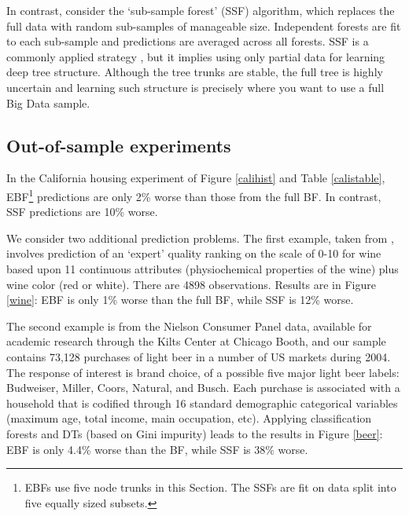 \documentclass{article}
\begin{document}
In contrast, consider the `sub-sample forest' (SSF) algorithm, which replaces the full data with random sub-samples of manageable size.  Independent forests are  fit to each sub-sample and predictions are averaged across all forests.
SSF is a commonly applied strategy \citep[e.g., see mention, but not recommendation, of it in][]{panda_planet:_2009}, but it implies using only partial data for learning deep tree structure.  Although the tree trunks are stable, the full tree is highly uncertain and learning such structure is precisely where you want to use a full Big Data sample.


\subsection{Out-of-sample experiments}\label{oos-experiment}

 
In the California housing  experiment of Figure \ref{calihist}
and Table \ref{calistable}, EBF\footnote{EBFs use five node trunks  in this Section.  The SSFs are fit on data split into five equally sized subsets.} predictions are only 2\% worse than those from the full BF.  In contrast, SSF predictions are 10\% worse.

We consider two additional prediction problems.  The first example, 
taken from \cite{CorCer09}, involves prediction of an `expert' quality ranking on
the scale of 0-10 for wine based upon 11 continuous attributes (physiochemical properties of the wine) plus
wine color (red or white).  There are 4898 observations.  Results are in Figure \ref{wine}:  EBF is only 1\% worse than the full BF, while SSF is 12\% worse.

The second example is from the Nielson Consumer Panel data, available for
academic research through the Kilts Center at Chicago Booth,
 and our sample contains 73,128 purchases
of light beer in a number of US markets  during 2004. The response of interest
is brand choice, of a possible five major light beer labels: Budweiser,
Miller, Coors, Natural, and Busch. Each purchase is associated with a
household that is codified through 16 standard demographic categorical
variables (maximum age, total income, main occupation, etc).  Applying
classification forests and DTs (based on Gini impurity) leads to the results
in Figure \ref{beer}:  EBF is only 4.4\% worse than the BF, while  SSF is 38\%
worse.
\end{document}
